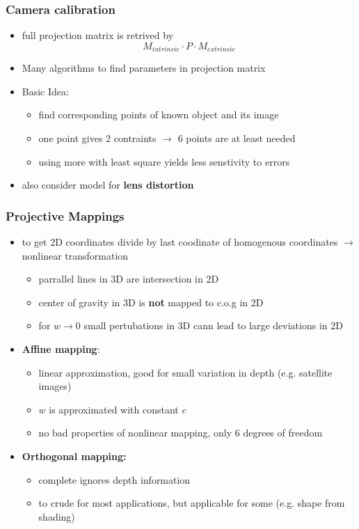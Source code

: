 \documentclass[11pt]{article}
\begin{document}
\subsubsection{Camera calibration}
\label{sec-6-1-4}
\begin{itemize}
\item full projection matrix is retrived by
      \[ M_{intrinsic} \cdot P \cdot M_{extrinsic} \]
\item Many algorithms to find parameters in projection matrix
\item Basic Idea:
\begin{itemize}
\item find corresponding points of known object and its image
\item one point gives 2 contraints $\rightarrow$ 6 points are at least needed
\item using more with least square yields less senstivity to errors
\end{itemize}
\item also consider model for \textbf{lens distortion}
\end{itemize}
\subsubsection{Projective Mappings}
\label{sec-6-1-5}
\begin{itemize}
\item to get 2D coordinates divide by last coodinate of homogenous coordinates
      $\rightarrow$ nonlinear transformation
\begin{itemize}
\item parrallel lines in 3D are intersection in 2D
\item center of gravity in 3D is \textbf{not} mapped to c.o.g in 2D
\item for $w \rightarrow 0$ small pertubations in 3D cann lead to large deviations in 2D
\end{itemize}
\item \textbf{Affine mapping}:
\begin{itemize}
\item linear approximation, good for small variation in depth (e.g. satellite images)
\item $w$ is approximated with constant $c$
\item no bad properties of nonlinear mapping, only 6 degrees of freedom
\end{itemize}
\item \textbf{Orthogonal mapping:}
\begin{itemize}
\item complete ignores depth information
\item to crude for most applications, but applicable for some (e.g. shape from shading)
\end{itemize}
\end{itemize}
\end{document}
